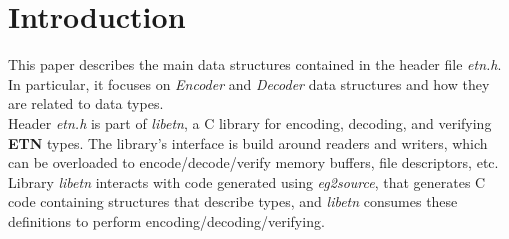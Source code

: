 \section*{Introduction}
This paper describes the main data structures contained in the header file \emph{etn.h}. In particular, it focuses on \emph{Encoder} and \emph{Decoder} data structures and how they are related to data types.\\
Header \emph{etn.h} is part of \emph{libetn}, a C library for encoding, decoding, and verifying \textbf{ETN} types. The library's interface is build around readers and writers, which can be overloaded to encode/decode/verify memory buffers, file descriptors, etc.\\
Library \emph{libetn} interacts with code generated using \emph{eg2source}, that generates C code containing structures that describe types, and \emph{libetn} consumes these definitions to perform encoding/decoding/verifying.\\


